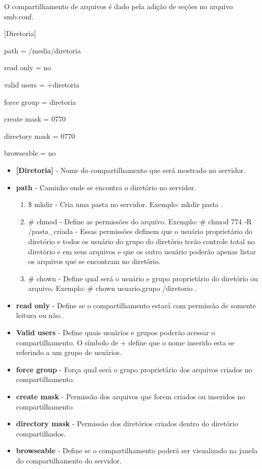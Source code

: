 O compartilhamento de arquivos é dado pela adição de seções no arquivo smb.conf.

[Diretoria]

path = /media/diretoria

read only = no

valid users = +diretoria

force group = diretoria

create mask = 0770

directory mask = 0770

browseable = no

\begin{itemize}
	\item \textbf{[Diretoria]} - Nome do compartilhamento que será mostrado no servidor.
	\item \textbf{path} - Caminho onde se encontra o diretório no servidor.
		\begin{enumerate}
			\item {\$ mkdir} - Cria uma pasta no servidor. Exemplo: mkdir pasta .
			\item {\# chmod} - Define as permissões do arquivo. Exemplo: \# chmod 774 -R /pasta\_criada - Essas permissões definem que o usuário proprietário do diretório e todos os usuário do grupo do diretório terão controle total no diretório e em seus arquivos e que os outro usuário poderão apenas listar os arquivos que se encontram no diretório.
			\item {\# chown} - Define qual será o usuário e grupo proprietário do diretório ou arquivo. Exemplo: \# chown usuario.grupo /diretorio .
		\end{enumerate} 
	\item \textbf{read only} - Define se o compartilhamento estará com permissão de somente leitura ou não.
	\item \textbf{Valid users} - Define quais usuários e grupos poderão acessar o compartilhamento. O símbolo de + define que o nome inserido esta se referindo a um grupo de usuários.
	\item \textbf{force group} - Força qual será o grupo proprietário dos arquivos criados no compartilhamento.
	\item \textbf{create mask} - Permissão dos arquivos que forem criados ou inseridos no compartilhamento
	\item \textbf{directory mask} - Permissão dos diretórios criados dentro do diretório compartilhados.
	\item \textbf{browseable} - Define se o compartilhamento poderá ser visualizado na janela do compartilhamento do servidor.
\end{itemize}

